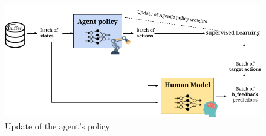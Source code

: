 \begin{figure}[H]
    \centering
    \includegraphics[width=.8\textwidth]{Figures/train_agent.png}
    \caption{Update of the agent's policy}
    \label{fig:update_agent}
\end{figure}




    

